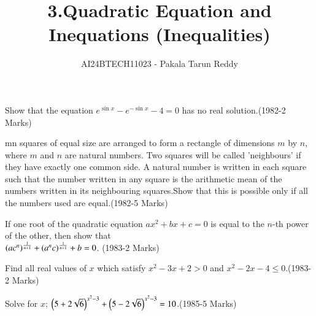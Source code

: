 \documentclass[journal,12pt,twocolumn]{IEEEtran}
\theoremstyle{remark}
\begin{document}

\vspace{3cm}

\title{3.Quadratic Equation and\\ Inequations (Inequalities)}
\author{AI24BTECH11023 - Pakala Tarun Reddy}
\maketitle
\begin{enumerate}[start=13]
\item Show that the equation $e^{\sin{x}}-e^{-\sin{x}}-4=0$ has no real solution.\hfill{(1982-2 Marks)}
\item mn squares of equal size are arranged to form a rectangle of dimensions $m$ by $n$, where $m$ and $n$ are natural numbers. Two squares will be called 'neighbours' if they have exactly one common side. A natural number is written in each square such that the number written in any square is the arithmetic mean of the numbers written in its neighbouring squares.Show that this is possible only if all the numbers used are equal.\hfill{(1982-5 Marks)}
\item {If one root of the quadratic equation $ax^2+bx+c=0$ is equal to the $n$-th power of the other, then show that\\
$\left(ac^n\right)^\frac{1}{n+1} +\left(a^nc\right)^\frac{1}{n+1}+b=0$. \hfill(1983-2 Marks)}
 \item {Find all real values of $x$ which satisfy $x^2-3x+2>0$ and $x^2-2x-4\leq 0$.\hfill{(1983-2 Marks)}
 \item Solve for $x$; $\left(5+2\sqrt{6}\right)^{x^2-3}+\left(5-2\sqrt{6}\right)^{x^2-3}=10$.\hfill{(1985-5 Marks)}
 
}
\end{enumerate}
\end{document}

